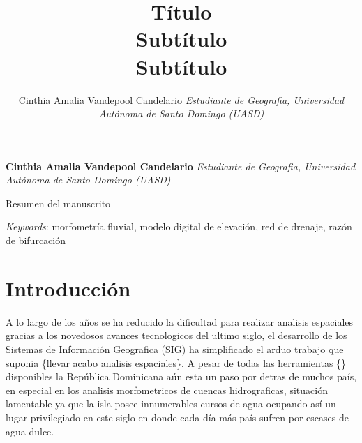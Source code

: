 \documentclass[11pt,]{article}
\title{Título\\
Subtítulo\\
Subtítulo  }
\author{\Large Cinthia Amalia Vandepool Candelario\vspace{0.05in} \newline\normalsize\emph{Estudiante de Geografia, Universidad Autónoma de Santo Domingo (UASD)}  }
\date{}
\newcommand*{\authorfont}{\fontfamily{phv}\selectfont}
\renewenvironment{abstract}
 {{%
    \setlength{\leftmargin}{0mm}
    \setlength{\rightmargin}{\leftmargin}%
  }%
  \relax}
 {\endlist}
\begin{document}
	
%

{%
\setlength{\parindent}{0pt}
\thispagestyle{plain}
{\fontsize{18}{20}\selectfont\raggedright 
\maketitle  %

}

{
   \vskip 13.5pt\relax \normalsize\fontsize{11}{12} 
\textbf{\authorfont Cinthia Amalia Vandepool Candelario} \hskip 15pt \emph{\small Estudiante de Geografia, Universidad Autónoma de Santo Domingo (UASD)}   

}

}








\begin{abstract}

    \hbox{\vrule height .2pt width 39.14pc}

    \vskip 8.5pt %

\noindent Resumen del manuscrito


\vskip 8.5pt \noindent \emph{Keywords}: morfometría fluvial, modelo digital de elevación, red de drenaje, razón
de bifurcación \par

    \hbox{\vrule height .2pt width 39.14pc}



\end{abstract}


\vskip 6.5pt


\noindent  \section{Introducción}\label{introducciuxf3n}

A lo largo de los años se ha reducido la dificultad para realizar
analisis espaciales gracias a los novedosos avances tecnologicos del
ultimo siglo, el desarrollo de los Sistemas de Información Geografica
(SIG) ha simplificado el arduo trabajo que suponia \{llevar acabo
analisis espaciales\}. A pesar de todas las herramientas \{\}
disponibles la República Dominicana aún esta un paso por detras de
muchos país, en especial en los analisis morfometricos de cuencas
hidrograficas, situación lamentable ya que la isla posee innumerables
cursos de agua ocupando así un lugar privilegiado en este siglo en donde
cada día más país sufren por escases de agua dulce.
\end{document}

